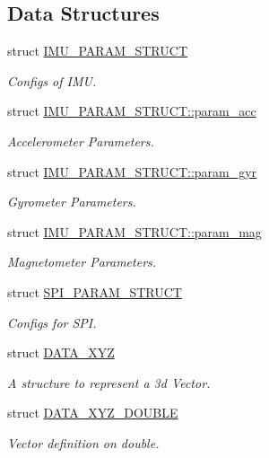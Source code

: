 \subsection*{Data Structures}
\begin{DoxyCompactItemize}
\item 
struct \hyperlink{structIMU__PARAM__STRUCT}{I\-M\-U\-\_\-\-P\-A\-R\-A\-M\-\_\-\-S\-T\-R\-U\-C\-T}
\begin{DoxyCompactList}\small\item\em Configs of I\-M\-U. \end{DoxyCompactList}\item 
struct \hyperlink{structIMU__PARAM__STRUCT_1_1param__acc}{I\-M\-U\-\_\-\-P\-A\-R\-A\-M\-\_\-\-S\-T\-R\-U\-C\-T\-::param\-\_\-acc}
\begin{DoxyCompactList}\small\item\em Accelerometer Parameters. \end{DoxyCompactList}\item 
struct \hyperlink{structIMU__PARAM__STRUCT_1_1param__gyr}{I\-M\-U\-\_\-\-P\-A\-R\-A\-M\-\_\-\-S\-T\-R\-U\-C\-T\-::param\-\_\-gyr}
\begin{DoxyCompactList}\small\item\em Gyrometer Parameters. \end{DoxyCompactList}\item 
struct \hyperlink{structIMU__PARAM__STRUCT_1_1param__mag}{I\-M\-U\-\_\-\-P\-A\-R\-A\-M\-\_\-\-S\-T\-R\-U\-C\-T\-::param\-\_\-mag}
\begin{DoxyCompactList}\small\item\em Magnetometer Parameters. \end{DoxyCompactList}\item 
struct \hyperlink{structSPI__PARAM__STRUCT}{S\-P\-I\-\_\-\-P\-A\-R\-A\-M\-\_\-\-S\-T\-R\-U\-C\-T}
\begin{DoxyCompactList}\small\item\em Configs for S\-P\-I. \end{DoxyCompactList}\item 
struct \hyperlink{structDATA__XYZ}{D\-A\-T\-A\-\_\-\-X\-Y\-Z}
\begin{DoxyCompactList}\small\item\em A structure to represent a 3d Vector. \end{DoxyCompactList}\item 
struct \hyperlink{structDATA__XYZ__DOUBLE}{D\-A\-T\-A\-\_\-\-X\-Y\-Z\-\_\-\-D\-O\-U\-B\-L\-E}
\begin{DoxyCompactList}\small\item\em Vector definition on double. \end{DoxyCompactList}\item 

\end{DoxyCompactItemize}

